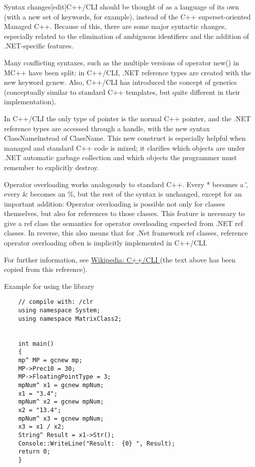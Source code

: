 Syntax changes[edit]C++/CLI should be thought of as a language of its own (with a new set of keywords, for example), instead of the C++ superset-oriented Managed C++. Because of this, there are some major syntactic changes, especially related to the elimination of ambiguous identifiers and the addition of .NET-specific features.

Many conflicting syntaxes, such as the multiple versions of operator new() in MC++ have been split: in C++/CLI, .NET reference types are created with the new keyword gcnew. Also, C++/CLI has introduced the concept of generics (conceptually similar to standard C++ templates, but quite different in their implementation).

In C++/CLI the only type of pointer is the normal C++ pointer, and the .NET reference types are accessed through a handle, with the new syntax ClassName\^ instead of ClassName\*. This new construct is especially helpful when managed and standard C++ code is mixed; it clarifies which objects are under .NET automatic garbage collection and which objects the programmer must remember to explicitly destroy.

Operator overloading works analogously to standard C++. Every * becomes a \^ , every \& becomes an \%, but the rest of the syntax is unchanged, except for an important addition: Operator overloading is possible not only for classes themselves, but also for references to those classes. This feature is necessary to give a ref class the semantics for operator overloading expected from .NET ref classes. In reverse, this also means that for .Net framework ref classes, reference operator overloading often is implicitly implemented in C++/CLI.

For further information, see \href{http://en.wikipedia.org/wiki/C%2B%2B/CLI}{Wikipedia: C++/CLI } (the text above has been copied from this reference).
	
	\noindent Example for using the library
	
	
	\begin{lstlisting}
	// compile with: /clr
	using namespace System;
	using namespace MatrixClass2;
	
	
	int main() 
	{
	mp^ MP = gcnew mp;
	MP->Prec10 = 30;
	MP->FloatingPointType = 3;
	mpNum^ x1 = gcnew mpNum;
	x1 = "3.4";
	mpNum^ x2 = gcnew mpNum;
	x2 = "13.4";
	mpNum^ x3 = gcnew mpNum;
	x3 = x1 / x2;
	String^ Result = x1->Str();
	Console::WriteLine("Result:  {0} ", Result);
	return 0;
	}
	\end{lstlisting}
	
